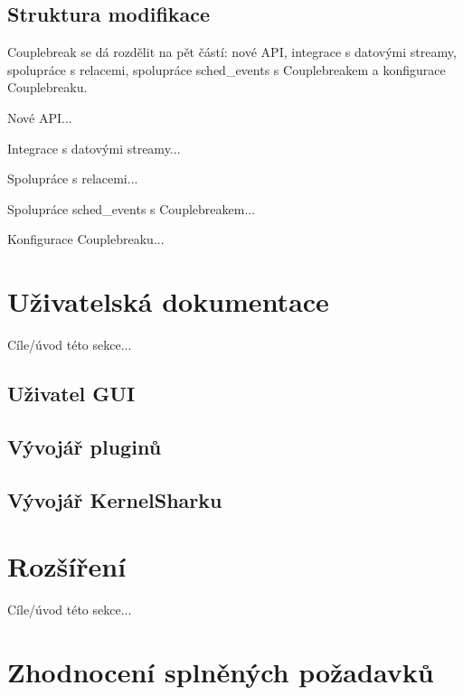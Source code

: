 \subsection{Struktura modifikace}
Couplebreak se dá rozdělit na pět částí: nové API, integrace s datovými streamy, spolupráce s relacemi, spolupráce sched\_events s Couplebreakem a konfigurace Couplebreaku. 

Nové API...

Integrace s datovými streamy...

Spolupráce s relacemi...

Spolupráce sched\_events s Couplebreakem...

Konfigurace Couplebreaku...

\section{Uživatelská dokumentace}

Cíle/úvod této sekce...

\subsection{Uživatel GUI}

\subsection{Vývojář pluginů}

\subsection{Vývojář KernelSharku}

\section{Rozšíření}

Cíle/úvod této sekce...

\section{Zhodnocení splněných požadavků}